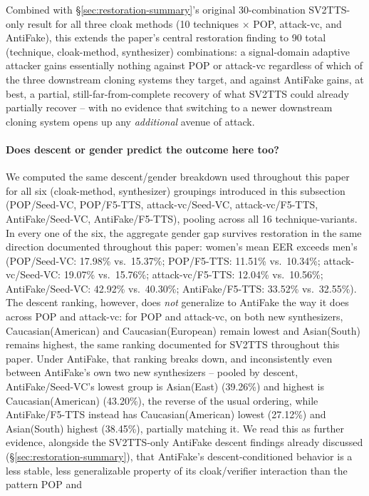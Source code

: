 \documentclass[11pt]{article}
\begin{document}
Combined with \S\ref{sec:restoration-summary}'s original 30-combination
SV2TTS-only result for all three cloak methods (10 techniques $\times$
POP, attack-vc, and AntiFake), this extends the paper's central
restoration finding to 90 total (technique, cloak-method, synthesizer)
combinations: a signal-domain adaptive attacker gains essentially
nothing against POP or attack-vc regardless of which of the three
downstream cloning systems they target, and against AntiFake gains, at
best, a partial, still-far-from-complete recovery of what SV2TTS could
already partially recover -- with no evidence that switching to a
newer downstream cloning system opens up any \emph{additional} avenue
of attack.

\paragraph{Does descent or gender predict the outcome here too?} We
computed the same descent/gender breakdown used throughout this paper
for all six (cloak-method, synthesizer) groupings introduced in this
subsection (POP/Seed-VC, POP/F5-TTS, attack-vc/Seed-VC,
attack-vc/F5-TTS, AntiFake/Seed-VC, AntiFake/F5-TTS), pooling across
all 16 technique-variants. In every one of the six, the aggregate
gender gap survives restoration in the same direction documented
throughout this paper: women's mean EER exceeds men's (POP/Seed-VC:
17.98\% vs.\ 15.37\%; POP/F5-TTS: 11.51\% vs.\ 10.34\%;
attack-vc/Seed-VC: 19.07\% vs.\ 15.76\%; attack-vc/F5-TTS: 12.04\% vs.\
10.56\%; AntiFake/Seed-VC: 42.92\% vs.\ 40.30\%; AntiFake/F5-TTS:
33.52\% vs.\ 32.55\%). The descent ranking, however, does \emph{not}
generalize to AntiFake the way it does across POP and attack-vc: for
POP and attack-vc, on both new synthesizers, Caucasian(American) and
Caucasian(European) remain lowest and Asian(South) remains highest, the
same ranking documented for SV2TTS throughout this paper. Under
AntiFake, that ranking breaks down, and inconsistently even between
AntiFake's own two new synthesizers -- pooled by descent,
AntiFake/Seed-VC's lowest group is Asian(East) (39.26\%) and highest is
Caucasian(American) (43.20\%), the reverse of the usual ordering, while
AntiFake/F5-TTS instead has Caucasian(American) lowest (27.12\%) and
Asian(South) highest (38.45\%), partially matching it. We read this as
further evidence, alongside the SV2TTS-only AntiFake descent findings
already discussed (\S\ref{sec:restoration-summary}), that AntiFake's
descent-conditioned behavior is a less stable, less generalizable
property of its cloak/verifier interaction than the pattern POP and
\end{document}
